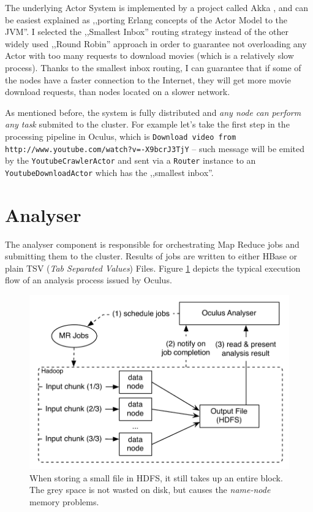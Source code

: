 The underlying Actor System is implemented by a project called Akka \cite{akka-docs}, and can be easiest explained as ,,porting Erlang concepts of the Actor Model to the JVM''. I selected the ,,Smallest Inbox'' routing strategy instead of the other widely used ,,Round Robin'' approach in order to guarantee not overloading any Actor with too many requests to download movies (which is a relatively slow process). Thanks to the smallest inbox routing, I can guarantee that if some of the nodes have a faster connection to the Internet, they will get more movie download requests, than nodes located on a slower network.

As mentioned before, the system is fully distributed and \textit{any node can perform any task} submited to the cluster. For example let's take the first step in the processing pipeline in Oculus, which is \verb|Download video from http://www.youtube.com/watch?v=-X9bcrJ3TjY| -- such message will be emited by the \verb|YoutubeCrawlerActor| and sent via a \verb|Router| instance to an \verb|YoutubeDownloadActor| which has the ,,smallest inbox''.



\section{Analyser}
The analyser component is responsible for orchestrating Map Reduce jobs and submitting them to the cluster. Results of jobs are written to either HBase or plain TSV (\textit{Tab Separated Values}) Files. Figure \ref{fig:analyser-high-level} depicts the typical execution flow of an analysis process issued by Oculus.

\begin{figure}[ch!]
  \centering
  \includegraphics[scale=0.9]{diagrams/analyser-high-level.pdf}
  \caption{When storing a small file in HDFS, it still takes up an entire block. The grey space is not wasted on disk, but causes the \textit{name-node} memory problems.}
  \label{fig:analyser-high-level}
\end{figure}

